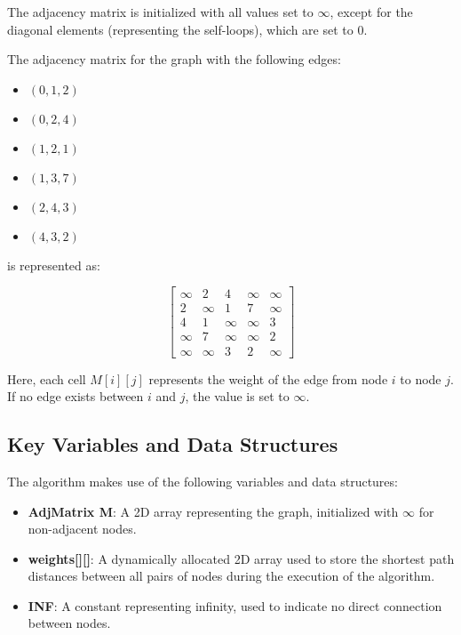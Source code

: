 \documentclass{book}
\begin{document}
The adjacency matrix is initialized with all values set to \(\infty\), except for the diagonal elements (representing the self-loops), which are set to 0.

The adjacency matrix for the graph with the following edges:

\begin{itemize}
    \item \( (0, 1, 2) \)
    \item \( (0, 2, 4) \)
    \item \( (1, 2, 1) \)
    \item \( (1, 3, 7) \)
    \item \( (2, 4, 3) \)
    \item \( (4, 3, 2) \)
\end{itemize}

is represented as:

\[
\begin{bmatrix}
\infty & 2 & 4 & \infty & \infty \\
2 & \infty & 1 & 7 & \infty \\
4 & 1 & \infty & \infty & 3 \\
\infty & 7 & \infty & \infty & 2 \\
\infty & \infty & 3 & 2 & \infty
\end{bmatrix}
\]

Here, each cell \( M[i][j] \) represents the weight of the edge from node \( i \) to node \( j \). If no edge exists between \( i \) and \( j \), the value is set to \(\infty\).

\subsection{Key Variables and Data Structures}

The algorithm makes use of the following variables and data structures:

\begin{itemize}
    \item \textbf{AdjMatrix M}: A 2D array representing the graph, initialized with \(\infty\) for non-adjacent nodes.
    \item \textbf{weights[][]}: A dynamically allocated 2D array used to store the shortest path distances between all pairs of nodes during the execution of the algorithm.
    \item \textbf{INF}: A constant representing infinity, used to indicate no direct connection between nodes.
\end{itemize}
\end{document}
